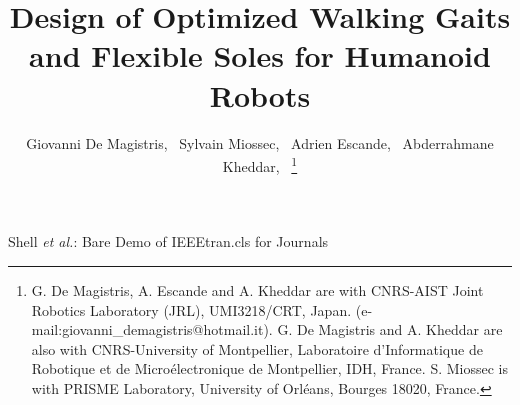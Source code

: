 \documentclass[journal]{IEEEtran}
\begin{document}
\title{Design of Optimized Walking Gaits and Flexible Soles for Humanoid Robots}

\author{Giovanni De Magistris,~
 		Sylvain Miossec,~
 		Adrien Escande,~
 		Abderrahmane Kheddar,~%
\thanks{G. De Magistris, A. Escande and A. Kheddar are with CNRS-AIST Joint Robotics Laboratory (JRL), UMI3218/CRT, Japan. (e-mail:giovanni\_demagistris@hotmail.it). G. De Magistris and A. Kheddar are also with CNRS-University of Montpellier, Laboratoire d'Informatique de Robotique et de Micro\'{e}lectronique de Montpellier, IDH, France. S. Miossec is with PRISME Laboratory, University of Orl\'{e}ans, Bourges 18020, France.}}
%

%
{Shell \MakeLowercase{\textit{et al.}}: Bare Demo of IEEEtran.cls for Journals}
% 
\end{document}
